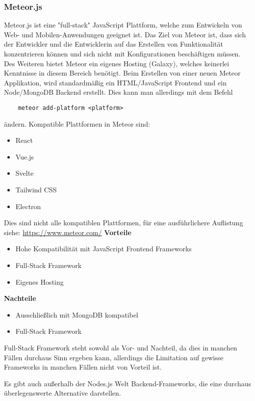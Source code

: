 \subsubsection{Meteor.js}
Meteor.js ist eine "full-stack" JavaScript Plattform, welche zum Entwickeln von Web- und Mobilen-Anwendungen geeignet ist. Das Ziel von Meteor ist, dass sich der Entwickler und die Entwicklerin auf das Erstellen von Funktionalität konzentrieren können und sich nicht mit Konfigurationen beschäftigen müssen. Des Weiteren bietet Meteor ein eigenes Hosting (Galaxy), welches keinerlei Kenntnisse in diesem Bereich benötigt. 
\newline
Beim Erstellen von einer neuen Meteor Applikation, wird standardmäßig ein HTML/JavaScript Frontend und ein Node/MongoDB Backend erstellt. Dies kann man allerdings mit dem Befehl
\begin{verbatim}
    meteor add-platform <platform>
\end{verbatim}
ändern. Kompatible Plattformen in Meteor sind:
\begin{itemize}
    \item React
    \item Vue.js
    \item Svelte
    \item Tailwind CSS
    \item Electron
\end{itemize}
Dies sind nicht alle kompatiblen Plattformen, für eine ausführlichere Auflistung siehe: \url{https://www.meteor.com/}
\newpage
\textbf{Vorteile}
\begin{itemize}
    \item Hohe Kompatibilität mit JavaScript Frontend Frameworks
    \item Full-Stack Framework
    \item Eigenes Hosting
\end{itemize}
\textbf{Nachteile}
\begin{itemize}
    \item Ausschließlich mit MongoDB kompatibel
    \item Full-Stack Framework
\end{itemize}
Full-Stack Framework steht sowohl als Vor- und Nachteil, da dies in manchen Fällen durchaus Sinn ergeben kann, allerdings die Limitation auf gewisse Frameworks in manchen Fällen nicht von Vorteil ist.
\cite{backend_meteor}
\cite{backend_meteor_1}

Es gibt auch außerhalb der Nodes.js Welt Backend-Frameworks, die eine durchaus überlegenswerte Alternative darstellen.

